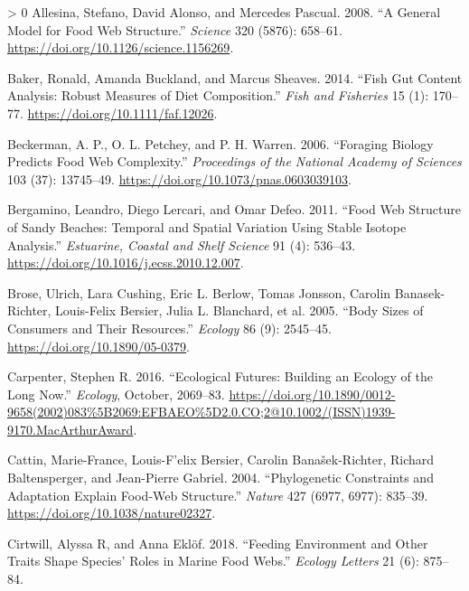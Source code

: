 \documentclass{article}
\newlength{\cslhangindent}
\newenvironment{CSLReferences}[3] %
 {%
  \setlength{\parindent}{0pt}
  \ifodd #1 \everypar{\setlength{\hangindent}{\cslhangindent}}\ignorespaces\fi
  \ifnum #2 > 0
  \setlength{\parskip}{#2\baselineskip}
  \fi
 }%
 {}
\begin{document}
\hypertarget{refs}{}
\begin{CSLReferences}{1}{0}
\leavevmode\hypertarget{ref-allesina2008}{}%
Allesina, Stefano, David Alonso, and Mercedes Pascual. 2008. {``A
General Model for Food Web Structure.''} \emph{Science} 320 (5876):
658--61. \url{https://doi.org/10.1126/science.1156269}.

\leavevmode\hypertarget{ref-bakerFishGutContent2014}{}%
Baker, Ronald, Amanda Buckland, and Marcus Sheaves. 2014. {``Fish Gut
Content Analysis: Robust Measures of Diet Composition.''} \emph{Fish and
Fisheries} 15 (1): 170--77. \url{https://doi.org/10.1111/faf.12026}.

\leavevmode\hypertarget{ref-beckermanForagingBiologyPredicts2006}{}%
Beckerman, A. P., O. L. Petchey, and P. H. Warren. 2006. {``Foraging
Biology Predicts Food Web Complexity.''} \emph{Proceedings of the
National Academy of Sciences} 103 (37): 13745--49.
\url{https://doi.org/10.1073/pnas.0603039103}.

\leavevmode\hypertarget{ref-bergaminoFoodWebStructure2011}{}%
Bergamino, Leandro, Diego Lercari, and Omar Defeo. 2011. {``Food Web
Structure of Sandy Beaches: {Temporal} and Spatial Variation Using
Stable Isotope Analysis.''} \emph{Estuarine, Coastal and Shelf Science}
91 (4): 536--43. \url{https://doi.org/10.1016/j.ecss.2010.12.007}.

\leavevmode\hypertarget{ref-broseBodySizesConsumers2005}{}%
Brose, Ulrich, Lara Cushing, Eric L. Berlow, Tomas Jonsson, Carolin
Banasek-Richter, Louis-Felix Bersier, Julia L. Blanchard, et al. 2005.
{``Body {Sizes} of {Consumers} and {Their Resources}.''} \emph{Ecology}
86 (9): 2545--45. \url{https://doi.org/10.1890/05-0379}.

\leavevmode\hypertarget{ref-carpenterEcologicalFuturesBuilding2016}{}%
Carpenter, Stephen R. 2016. {``Ecological Futures: Building an Ecology
of the Long Now.''} \emph{Ecology}, October, 2069--83.
\url{https://doi.org/10.1890/0012-9658(2002)083\%5B2069:EFBAEO\%5D2.0.CO;2@10.1002/(ISSN)1939-9170.MacArthurAward}.

\leavevmode\hypertarget{ref-cattinPhylogeneticConstraintsAdaptation2004}{}%
Cattin, Marie-France, Louis-F'elix Bersier, Carolin Banašek-Richter,
Richard Baltensperger, and Jean-Pierre Gabriel. 2004. {``Phylogenetic
Constraints and Adaptation Explain Food-Web Structure.''} \emph{Nature}
427 (6977, 6977): 835--39. \url{https://doi.org/10.1038/nature02327}.

\leavevmode\hypertarget{ref-cirtwill2018feeding}{}%
Cirtwill, Alyssa R, and Anna Eklöf. 2018. {``Feeding Environment and
Other Traits Shape Species' Roles in Marine Food Webs.''} \emph{Ecology
Letters} 21 (6): 875--84.


\end{CSLReferences}
\end{document}
